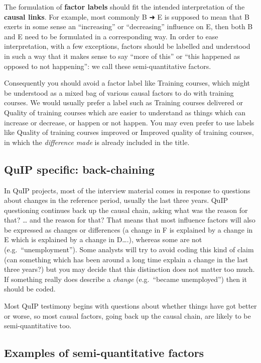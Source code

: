 \documentclass[
]{book}
\begin{document}
The formulation of \textbf{factor labels} should fit the intended interpretation of the \textbf{causal links}. For example, most commonly B ➜ E is supposed to mean that B exerts in some sense an ``increasing'' or ``decreasing'' influence on E, then both B and E need to be formulated in a corresponding way. In order to ease interpretation, with a few exceptions, factors should be labelled and understood in such a way that it makes sense to say ``more of this'' or ``this happened as opposed to not happening'': we call these semi-quantitative factors.

Consequently you should avoid a factor label like Training courses, which might be understood as a mixed bag of various causal factors to do with training courses. We would usually prefer a label such as Training courses delivered or Quality of training courses which are easier to understand as things which can increase or decrease, or happen or not happen. You may even prefer to use labels like Quality of training courses improved or Improved quality of training courses, in which the \emph{difference made} is already included in the title.

\hypertarget{quip-specific-back-chaining}{%
\subsection{QuIP specific: back-chaining}\label{quip-specific-back-chaining}}

In QuIP projects, most of the interview material comes in response to questions about changes in the reference period, usually the last three years. QuIP questioning continues back up the causal chain, asking what was the reason for that? \ldots{} and the reason for that? That means that most influence factors will also be expressed as changes or differences (a change in F is explained by a change in E which is explained by a change in D\ldots.), whereas some are not (e.g.~``unemployment''). Some analysts will try to avoid coding this kind of claim (can something which has been around a long time explain a change in the last three years?) but you may decide that this distinction does not matter too much. If something really does describe a \emph{change} (e.g.~``became unemployed'') then it should be coded.

Most QuIP testimony begins with questions about whether things have got better or worse, so most causal factors, going back up the causal chain, are likely to be semi-quantitative too.

\hypertarget{examples-of-semi-quantitative-factors}{%
\subsection{Examples of semi-quantitative factors}\label{examples-of-semi-quantitative-factors}}
\end{document}
